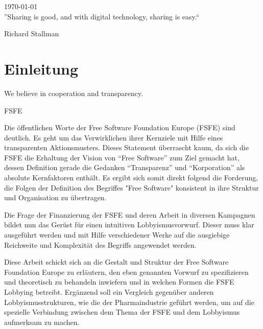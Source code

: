 \begin{titlepage}

{\large \today}\\[3cm] %
\newpage
''Sharing is good, and with digital technology, sharing is easy.``

Richard Stallman






\vfill %

\end{titlepage}

\tableofcontents
\newpage

\section{Einleitung}
\epigraph{We believe in cooperation and transparency.}{FSFE}
Die öffentlichen Worte der Free Software Foundation Europe (FSFE) sind deutlich. 
Es geht
um das Verwirklichen ihrer Kernziele mit Hilfe eines transparenten 
Aktionsmusters.
Dieses Statement überrascht kaum, da sich die FSFE die Erhaltung der Vision von 
``Free Software'' zum Ziel gemacht hat, dessen Definition gerade die Gedanken 
``Transparenz'' und ``Korporation'' als absolute Kernfaktoren enthält. Es ergibt 
sich somit direkt folgend die Forderung, die Folgen der Definition des Begriffes 
"Free Software" konsistent in ihre Struktur und Organisation zu übertragen.

Die Frage der Finanzierung der FSFE und deren Arbeit in diversen
Kampagnen bildet nun das Gerüst für einen intuitiven Lobbyismusvorwurf. Dieser 
muss klar ausgeführt werden und mit Hilfe
verschiedener Werke auf die ausgiebige Reichweite und Komplexität
des Begriffs angewendet werden.

Diese Arbeit schickt sich an die Gestalt und Struktur der Free Software 
Foundation Europe zu erläutern, den eben genannten Vorwurf zu spezifizieren und 
theoretisch zu behandeln inwiefern und in welchen Formen die FSFE Lobbying 
betreibt. Ergänzend soll ein Vergleich gegenüber anderen Lobbyismusstrukturen,
wie die der Pharmaindustrie geführt werden, um auf die spezielle Verbindung 
zwischen dem Thema der FSFE und dem Lobbyismus aufmerksam zu machen.
\newpage

